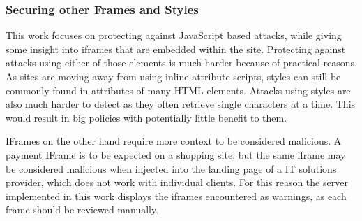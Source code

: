 \subsubsection{Securing other Frames and Styles}

This work focuses on protecting against JavaScript based attacks, while giving some insight into iframes that are embedded within the site.
Protecting against attacks using either of those elements is much harder because of practical reasons.
As sites are moving away from using inline attribute scripts, styles can still be commonly found in attributes of many HTML elements.
Attacks using styles are also much harder to detect as they often retrieve single characters at a time.
This would result in big policies with potentially little benefit to them.

IFrames on the other hand require more context to be considered malicious.
A payment IFrame is to be expected on a shopping site, but the same iframe may be considered malicious when injected into the landing page of a IT solutions provider, which does not work with individual clients.
For this reason the server implemented in this work displays the iframes encountered as warnings, as each frame should be reviewed manually.

